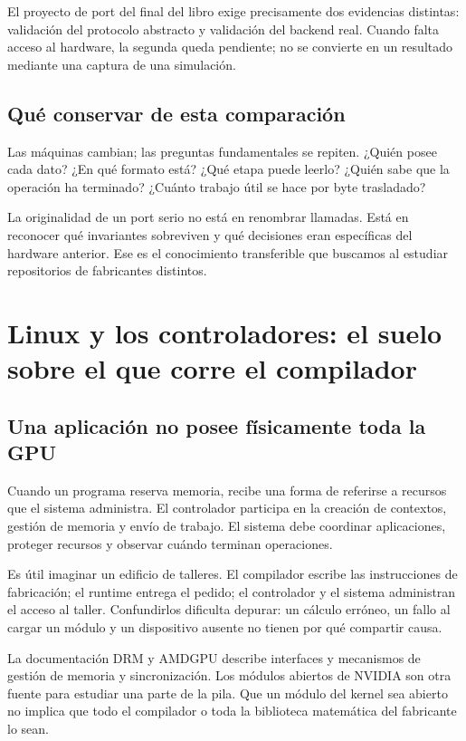 \documentclass[12pt,a4paper,oneside]{report}
\begin{document}
El proyecto de port del final del libro exige precisamente dos evidencias distintas: validación del protocolo abstracto y validación del backend real. Cuando falta acceso al hardware, la segunda queda pendiente; no se convierte en un resultado mediante una captura de una simulación.

\section{Qué conservar de esta comparación}
Las máquinas cambian; las preguntas fundamentales se repiten. ¿Quién posee cada dato? ¿En qué formato está? ¿Qué etapa puede leerlo? ¿Quién sabe que la operación ha terminado? ¿Cuánto trabajo útil se hace por byte trasladado?

La originalidad de un port serio no está en renombrar llamadas. Está en reconocer qué invariantes sobreviven y qué decisiones eran específicas del hardware anterior. Ese es el conocimiento transferible que buscamos al estudiar repositorios de fabricantes distintos.

\chapter{Linux y los controladores: el suelo sobre el que corre el compilador}
\label{ch:linux}
\section{Una aplicación no posee físicamente toda la GPU}
Cuando un programa reserva memoria, recibe una forma de referirse a recursos que el sistema administra. El controlador participa en la creación de contextos, gestión de memoria y envío de trabajo. El sistema debe coordinar aplicaciones, proteger recursos y observar cuándo terminan operaciones.

Es útil imaginar un edificio de talleres. El compilador escribe las instrucciones de fabricación; el runtime entrega el pedido; el controlador y el sistema administran el acceso al taller. Confundirlos dificulta depurar: un cálculo erróneo, un fallo al cargar un módulo y un dispositivo ausente no tienen por qué compartir causa.

La documentación DRM y AMDGPU describe interfaces y mecanismos de gestión de memoria y sincronización. Los módulos abiertos de NVIDIA son otra fuente para estudiar una parte de la pila. Que un módulo del kernel sea abierto no implica que todo el compilador o toda la biblioteca matemática del fabricante lo sean. \cite{linux-mm,linux-amdgpu,nvidia-driver}
\end{document}
